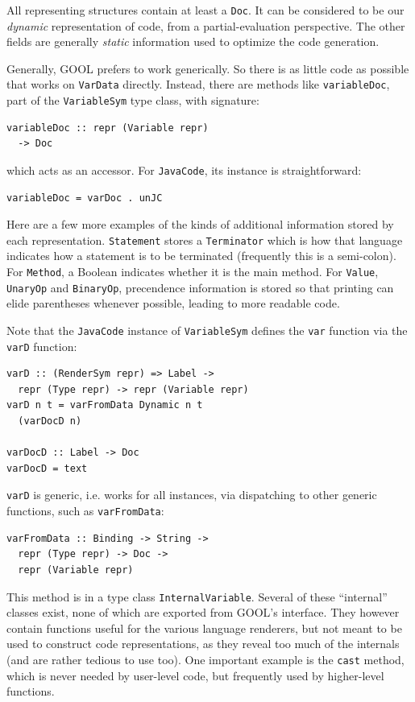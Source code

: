 \documentclass[sigplan,review,anonymous,prologue,dvipsnames]{acmart}
\begin{document}
All representing structures contain at least a \verb|Doc|. It can be considered
to be our \emph{dynamic} representation of code, from a partial-evaluation
perspective. The other fields are generally \emph{static} information used to
optimize the code generation.

Generally, GOOL prefers to work generically. So there is as little code as
possible that works on \verb|VarData| directly.  Instead, there are
methods like \verb|variableDoc|, part of the \verb|VariableSym| type class,
with signature:
\begin{lstlisting}
variableDoc :: repr (Variable repr)
  -> Doc
\end{lstlisting}
which acts as an accessor.  For \verb|JavaCode|, its instance is
straightforward:
\begin{lstlisting}
variableDoc = varDoc . unJC
\end{lstlisting}

Here are a few more examples of the kinds of additional information stored by
each representation. \verb|Statement| stores a
\verb|Terminator| which is how that language indicates how a statement is to be
terminated (frequently this is a semi-colon).  For \verb|Method|, a Boolean
indicates whether it is the main method.  For \verb|Value|, \verb|UnaryOp|
and \verb|BinaryOp|, precendence information is stored so that printing can
elide parentheses whenever possible, leading to more readable code.

Note that the \verb|JavaCode| instance of \verb|VariableSym| defines the
\verb|var| function via the \verb|varD| function:
\begin{lstlisting}
varD :: (RenderSym repr) => Label ->
  repr (Type repr) -> repr (Variable repr)
varD n t = varFromData Dynamic n t
  (varDocD n)

varDocD :: Label -> Doc
varDocD = text
\end{lstlisting}
\verb|varD| is generic, i.e. works for all instances, via dispatching to other
generic functions, such as \verb|varFromData|:
\begin{lstlisting}
varFromData :: Binding -> String ->
  repr (Type repr) -> Doc ->
  repr (Variable repr)
\end{lstlisting}
This method is in a type class \verb|InternalVariable|. Several of these
``internal'' classes exist, none of which are exported from GOOL's interface.
They however contain functions useful for the various language renderers, but
not meant to be used to construct code representations, as they reveal too
much of the internals (and are rather tedious to use too).  One important
example is the \verb|cast| method, which is never needed by user-level code,
but frequently used by higher-level functions.
\end{document}
